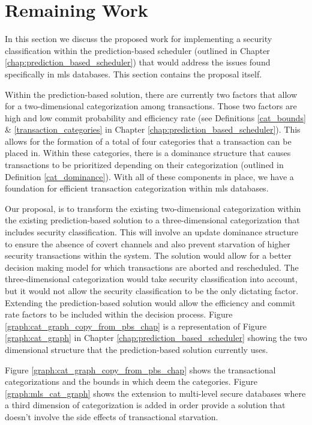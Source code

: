 \section{Remaining Work}
\label{mls:remaining_work}

In this section we discuss the proposed work for implementing a security classification within the prediction-based scheduler (outlined in Chapter \ref{chap:prediction_based_scheduler}) that would address the issues found specifically in \gls{mls} databases. This section contains the proposal itself.

Within the prediction-based solution, there are currently two factors that allow for a two-dimensional categorization among transactions. Those two factors are high and low commit probability and efficiency rate (see Definitions \ref{cat_bounds} \& \ref{transaction_categories} in Chapter \ref{chap:prediction_based_scheduler}). This allows for the formation of a total of four categories that a transaction can be placed in. Within these categories, there is a dominance structure that causes transactions to be prioritized depending on their categorization (outlined in Definition \ref{cat_dominance}). With all of these components in place, we have a foundation for efficient transaction categorization within \gls{mls} databases.

Our proposal, is to transform the existing two-dimensional categorization within the existing prediction-based solution to a three-dimensional categorization that includes security classification. This will involve an update dominance structure to ensure the absence of covert channels and also prevent starvation of higher security transactions within the system. The solution would allow for a better decision making model for which transactions are aborted and rescheduled. The three-dimensional categorization would take security classification into account, but it would not allow the security classification to be the only dictating factor. Extending the prediction-based solution would allow the efficiency and commit rate factors to be included within the decision process. Figure \ref{graph:cat_graph_copy_from_pbs_chap} is a representation of Figure \ref{graph:cat_graph} in Chapter \ref{chap:prediction_based_scheduler} showing the two dimensional structure that the prediction-based solution currently uses.


Figure \ref{graph:cat_graph_copy_from_pbs_chap} shows the transactional categorizations and the bounds in which deem the categories. Figure \ref{graph:mls_cat_graph} shows the extension to multi-level secure databases where a third dimension of categorization is added in order provide a solution that doesn't involve the side effects of transactional starvation.

